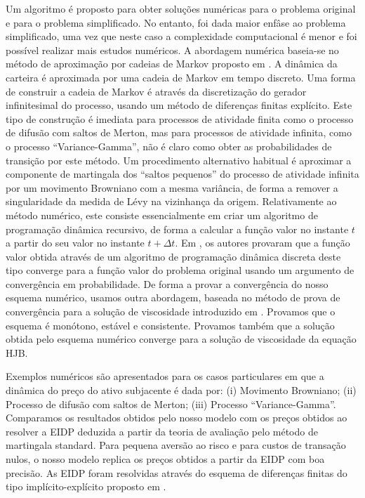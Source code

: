 Um algoritmo é proposto para obter soluções numéricas para o problema original e para o problema simplificado. 
No entanto, foi dada maior enfâse ao problema simplificado, uma vez que neste caso a complexidade computacional é menor e foi possível realizar mais estudos numéricos. 
A abordagem numérica baseia-se no método de aproximação por cadeias de Markov proposto em \cite{Kushner}. 
A dinâmica da carteira é aproximada por uma cadeia de Markov em tempo discreto. 
Uma forma de construir a cadeia de Markov é através da discretização do gerador infinitesimal do processo, usando um método de diferenças finitas explícito. 
Este tipo de construção é imediata para processos de atividade finita como o processo de difusão com saltos de Merton, mas para processos de atividade infinita, 
como o processo “Variance-Gamma”, não é claro como obter as probabilidades de transição por este método. 
Um procedimento alternativo habitual é aproximar a componente de martingala dos “saltos pequenos” do processo de atividade infinita por um movimento Browniano com a mesma variância, 
de forma a remover a singularidade da medida de Lévy na vizinhança da origem. 
Relativamente ao método numérico, este consiste essencialmente em criar um algoritmo de programação dinâmica recursivo, 
de forma a calcular a função valor no instante $t$ a partir do seu valor no instante $t+\Delta t$. 
Em \cite{Kushner}, os autores provaram que a função valor obtida através de um algoritmo de programação dinâmica discreta deste tipo converge para a função valor do problema 
original usando um argumento de convergência em probabilidade. 
De forma a provar a convergência do nosso esquema numérico, usamos outra abordagem, baseada no método de prova de convergência para a solução de viscosidade introduzido 
em \cite{BaSo91}. 
Provamos que o esquema é monótono, estável e consistente. Provamos também que a solução obtida pelo esquema numérico converge para a solução de viscosidade da equação HJB. 

Exemplos numéricos são apresentados para os casos particulares em que a dinâmica do preço do ativo subjacente é dada por: 
(i) Movimento Browniano; (ii) Processo de difusão com saltos de Merton; (iii) Processo “Variance-Gamma”.  
Comparamos os resultados obtidos pelo nosso modelo com os preços obtidos ao resolver a EIDP deduzida a partir da teoria de avaliação pelo método de martingala standard. 
Para pequena aversão ao risco e para custos de transação nulos, o nosso modelo replica os preços obtidos a partir da EIDP com boa precisão.  
As EIDP foram resolvidas através do esquema de diferenças finitas do tipo implícito-explícito proposto em \cite{CoVo05b}. 


